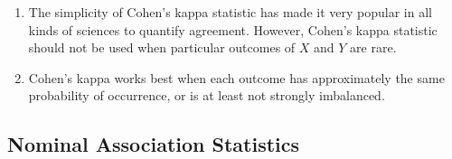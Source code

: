 \begin{enumerate}
    \item The simplicity of Cohen’s kappa statistic has made it very popular in all kinds of sciences to quantify agreement.
    However, Cohen’s kappa statistic should not be used when particular outcomes of $X$ and $Y$ are rare.
    \hfill \cite{statistics/book/Statistics-for-Data-Scientists/Maurits-Kaptein}

    \item Cohen’s kappa works best when each outcome has approximately the same probability of occurrence, or is at least not strongly imbalanced.
    \hfill \cite{statistics/book/Statistics-for-Data-Scientists/Maurits-Kaptein}
\end{enumerate}







\subsection{Nominal Association Statistics}

